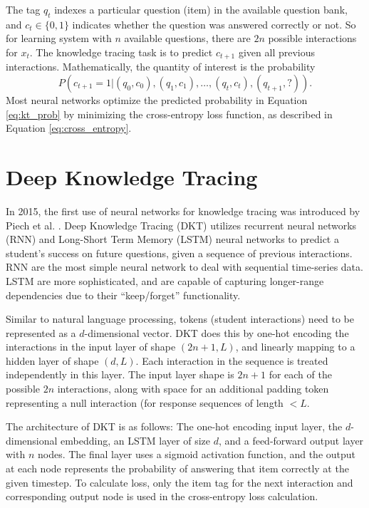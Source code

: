 The tag $q_t$ indexes a particular question (item) in the available question bank, and $c_t \in\{0,1\}$ indicates whether the question was answered correctly or not. So for learning system with $n$ available questions, there are $2n$ possible interactions for $x_t$. The knowledge tracing task is to predict $c_{t+1}$ given all previous interactions. Mathematically, the quantity of interest is the probability 
\begin{equation}
  P(c_{t+1} = 1 | (q_0,c_0), (q_1,c_1),\ldots,(q_t, c_t), (q_{t+1}, ?)).
  \label{eq:kt_prob}
\end{equation}
Most neural networks optimize the predicted probability in Equation \ref{eq:kt_prob} by  minimizing the cross-entropy loss function, as described in Equation \ref{eq:cross_entropy}.

\section{Deep Knowledge Tracing}
In 2015, the first use of neural networks for knowledge tracing was introduced by Piech et al. \cite{piech2015}. Deep Knowledge Tracing (DKT) utilizes recurrent neural networks (RNN) and Long-Short Term Memory (LSTM) neural networks to predict a student's success on future questions, given a sequence of previous interactions. RNN are the most simple neural network to deal with sequential time-series data. LSTM are more sophisticated, and are capable of capturing longer-range dependencies due to their ``keep/forget'' functionality. %

Similar to natural language processing, tokens (student interactions) need to be represented as a $d$-dimensional vector. DKT does this by one-hot encoding the interactions in the input layer of shape $(2n+1, L)$,  and linearly mapping to a hidden layer of shape $(d, L)$. Each interaction in the sequence is treated independently in this layer. The input layer shape is $2n+1$ for each of the possible $2n$ interactions, along with space for an additional padding token representing a null interaction (for response sequences of length $< L$.

  The architecture of DKT is as follows: The one-hot encoding input layer, the $d$-dimensional embedding, an LSTM layer of size $d$, and a feed-forward output layer with $n$ nodes. The final layer uses a sigmoid activation function, and the output at each node represents the probability of answering that item correctly at the given timestep. To calculate loss, only the item tag for the next interaction and corresponding output node is used in the cross-entropy loss calculation.

